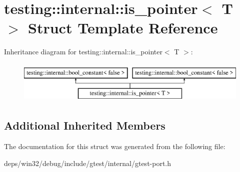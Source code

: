 \hypertarget{structtesting_1_1internal_1_1is__pointer}{}\section{testing\+:\+:internal\+:\+:is\+\_\+pointer$<$ T $>$ Struct Template Reference}
\label{structtesting_1_1internal_1_1is__pointer}
Inheritance diagram for testing\+:\+:internal\+:\+:is\+\_\+pointer$<$ T $>$\+:\begin{figure}[H]
\begin{center}
\leavevmode
\includegraphics[height=2.000000cm]{structtesting_1_1internal_1_1is__pointer}
\end{center}
\end{figure}
\subsection*{Additional Inherited Members}


The documentation for this struct was generated from the following file\+:\begin{DoxyCompactItemize}
\item 
deps/win32/debug/include/gtest/internal/gtest-\/port.\+h\end{DoxyCompactItemize}
